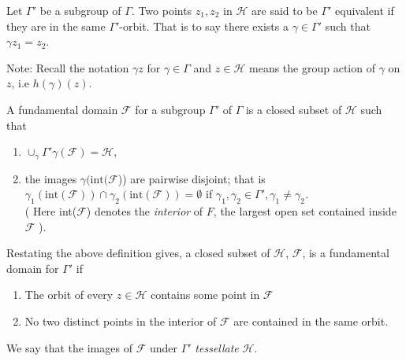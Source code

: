 \begin{definition}
Let $\Gamma'$ be a subgroup of $\Gamma$. Two points $z_1, z_2$ in $\mathcal{H}$ are said to be $\Gamma'$ equivalent if they are in the same $\Gamma'$-orbit. That is to say there exists a $\gamma \in \Gamma'$ such that $\gamma z_1 = z_2$. 
\end{definition}
Note: Recall the notation $\gamma z$ for $\gamma \in \Gamma$ and $z \in \mathcal{H}$ means the group action of $\gamma$ on $z$, i.e $h(\gamma)(z)$. 
\begin{definition}
A fundamental domain $\mathcal{F}$ for a subgroup $\Gamma'$ of $\Gamma$ is a closed subset of $\mathcal{H}$ such that 
\begin{enumerate}
\item $ \cup_\gamma \Gamma' \gamma(\mathcal{F}) =\mathcal{H}$,
\item the images $\gamma(\text{int}(\mathcal{F}$)) are pairwise disjoint; that is $\gamma_1(\text{int}(\mathcal{F})) \cap \gamma_2(\text{int}(\mathcal{F})) = \emptyset$ if $ \gamma_1, \gamma_2 \in \Gamma', \gamma_1 \neq \gamma_2$. \\
( Here int($\mathcal{F}$) denotes the \textit{interior} of $F$, the largest open set contained inside $\mathcal{F}$ ). 
\end{enumerate}
\end{definition}

Restating the above definition gives, a closed subset of $\mathcal{H}$, $\mathcal{F}$, is a fundamental domain for $\Gamma'$ if 
\begin{enumerate}
\item The orbit of every $z \in \mathcal{H}$ contains some point in $\mathcal{F}$ 
\item No two distinct points in the interior of $\mathcal{F}$ are contained in the same orbit.
\end{enumerate}
We say that the images of $\mathcal{F}$ under $\Gamma'$ \textit{tessellate} $\mathcal{H}$.

